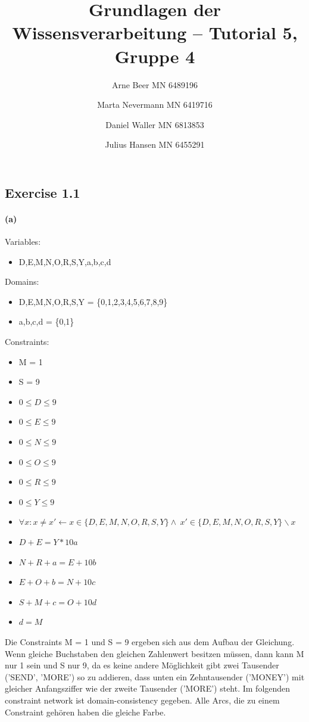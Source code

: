 \documentclass[]{article}
\title{Grundlagen der Wissensverarbeitung -- Tutorial 5, Gruppe 4}
\author{Arne Beer MN 6489196 \and Marta Nevermann MN 6419716 \and Daniel Waller MN 6813853 \and Julius Hansen MN 6455291}
\date{}
\begin{document}
\maketitle


\subsection{Exercise 1.1}\label{exercise-1.1}

\paragraph{(a)}\label{a}

Variables:
    \begin{itemize}
      \item D,E,M,N,O,R,S,Y,a,b,c,d
    \end{itemize}
Domains:
  \begin{itemize} 
    \item D,E,M,N,O,R,S,Y = \{0,1,2,3,4,5,6,7,8,9\}
    \item a,b,c,d = \{0,1\}
  \end{itemize}

Constraints:
\begin{itemize}
    \item M = 1 
    \item S = 9
    \item $0 \leq D \leq 9$
    \item $0 \leq E \leq 9$
    \item $0 \leq N \leq 9$
    \item $0 \leq O \leq 9$
    \item $0 \leq R \leq 9$
    \item $0 \leq Y \leq 9$
    \item $\forall x : x \neq  x' \leftarrow x \in \{D,E,M,N,O,R,S,Y\} \wedge \ x' \in \{D,E,M,N,O,R,S,Y\}\backslash x$
    \item $D + E = Y * 10a$
    \item $N + R + a = E + 10b$
    \item $E + O + b = N + 10c$
    \item $S + M + c = O + 10d$
    \item $d = M$
\end{itemize}

Die Constraints M = 1 und S = 9 ergeben sich aus dem Aufbau der Gleichung. Wenn gleiche Buchstaben den gleichen Zahlenwert besitzen müssen, dann kann M nur 1 sein und S nur 9, da es keine andere Möglichkeit gibt zwei Tausender ('SEND', 'MORE') so zu addieren, dass unten ein Zehntausender ('MONEY') mit gleicher Anfangsziffer wie der zweite Tausender ('MORE') steht.\newline\newline
Im folgenden constraint network ist domain-consistency gegeben. Alle Arcs, die zu einem Constraint gehören haben die gleiche Farbe.\newline
\end{document}
